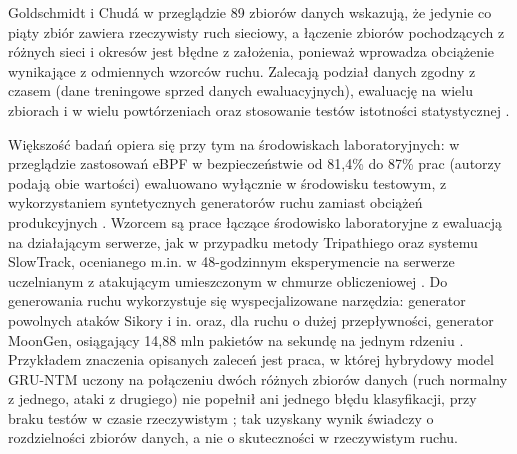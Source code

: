 \documentclass[a4paper,12pt]{article}
\begin{document}
Goldschmidt i Chudá w przeglądzie 89 zbiorów danych wskazują, że jedynie co piąty zbiór zawiera rzeczywisty ruch sieciowy, a łączenie zbiorów pochodzących z różnych sieci i okresów jest błędne z założenia, ponieważ wprowadza obciążenie wynikające z odmiennych wzorców ruchu. Zalecają podział danych zgodny z czasem (dane treningowe sprzed danych ewaluacyjnych), ewaluację na wielu zbiorach i w wielu powtórzeniach oraz stosowanie testów istotności statystycznej \cite{goldschmidt2025network}.

Większość badań opiera się przy tym na środowiskach laboratoryjnych: w przeglądzie zastosowań eBPF w bezpieczeństwie od 81,4\% do 87\% prac (autorzy podają obie wartości) ewaluowano wyłącznie w środowisku testowym, z wykorzystaniem syntetycznych generatorów ruchu zamiast obciążeń produkcyjnych \cite{kostopoulos2026ebpf}. Wzorcem są prace łączące środowisko laboratoryjne z ewaluacją na działającym serwerze, jak w przypadku metody Tripathiego \cite{tripathi2024delays} oraz systemu SlowTrack, ocenianego m.in. w 48-godzinnym eksperymencie na serwerze uczelnianym z atakującym umieszczonym w chmurze obliczeniowej \cite{sood2023slowtrack}. Do generowania ruchu wykorzystuje się wyspecjalizowane narzędzia: generator powolnych ataków Sikory i in. \cite{sikora2021generator} oraz, dla ruchu o dużej przepływności, generator MoonGen, osiągający 14,88 mln pakietów na sekundę na jednym rdzeniu \cite{emmerich2015moongen}. Przykładem znaczenia opisanych zaleceń jest praca, w której hybrydowy model GRU-NTM uczony na połączeniu dwóch różnych zbiorów danych (ruch normalny z jednego, ataki z drugiego) nie popełnił ani jednego błędu klasyfikacji, przy braku testów w czasie rzeczywistym \cite{panggabean2024intelligent}; tak uzyskany wynik świadczy o rozdzielności zbiorów danych, a nie o skuteczności w rzeczywistym ruchu.
\end{document}
